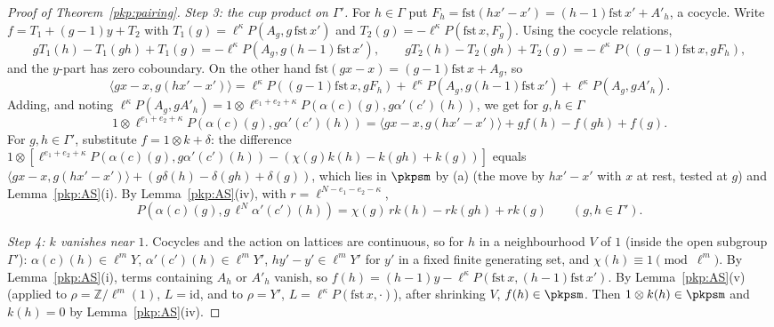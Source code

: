 \documentclass[10pt]{amsart}
\theoremstyle{definition}
\theoremstyle{remark}
\newcommand{\Z}{\mathbb Z}
\begin{document}
\begin{proof}[Proof of Theorem~\ref{pkp:pairing}]
\emph{Step 3: the cup product on $\Gamma'$.} For $h\in\Gamma$ put $F_h=\mathrm{fst}(hx'-x')=(h-1)
\mathrm{fst}\,x'+A'_h$, a cocycle. Write $f=T_1+(g-1)y+T_2$ with $T_1(g)=\ell^\kappa P(A_g,g\,
\mathrm{fst}\,x')$ and $T_2(g)=-\ell^\kappa P(\mathrm{fst}\,x,F_g)$. Using the cocycle relations,
\[
gT_1(h)-T_1(gh)+T_1(g)=-\ell^\kappa P(A_g,g(h-1)\mathrm{fst}\,x'),\qquad
gT_2(h)-T_2(gh)+T_2(g)=-\ell^\kappa P((g-1)\mathrm{fst}\,x,gF_h),
\]
and the $y$-part has zero coboundary. On the other hand $\mathrm{fst}(gx-x)=(g-1)\mathrm{fst}\,x+A_g$, so
\[
\langle gx-x,g(hx'-x')\rangle=\ell^\kappa P((g-1)\mathrm{fst}\,x,gF_h)+\ell^\kappa
P(A_g,g(h-1)\mathrm{fst}\,x')+\ell^\kappa P(A_g,gA'_h).
\]
Adding, and noting $\ell^\kappa P(A_g,gA'_h)=1\otimes\ell^{e_1+e_2+\kappa}P(\alpha(c)(g),g\alpha'(c')(h))$,
we get for $g,h\in\Gamma$
\[
1\otimes\ell^{e_1+e_2+\kappa}P(\alpha(c)(g),g\alpha'(c')(h))=\langle
gx-x,g(hx'-x')\rangle+gf(h)-f(gh)+f(g).
\]
For $g,h\in\Gamma'$, substitute $f=1\otimes k+\delta$: the difference
$1\otimes[\ell^{e_1+e_2+\kappa}P(\alpha(c)(g),g\alpha'(c')(h))-(\chi(g)k(h)-k(gh)+k(g))]$ equals
$\langle gx-x,g(hx'-x')\rangle+(g\delta(h)-\delta(gh)+\delta(g))$, which lies in $\pkpsm$ by (a)
(the move by $hx'-x'$ with $x$ at rest, tested at $g$) and Lemma~\ref{pkp:AS}(i). By
Lemma~\ref{pkp:AS}(iv), with $r=\ell^{N-e_1-e_2-\kappa}$,
\begin{equation}\label{pkp:eq-cob}
P(\alpha(c)(g),g\,\ell^N\alpha'(c')(h))=\chi(g)\,rk(h)-rk(gh)+rk(g)\qquad(g,h\in\Gamma').
\end{equation}

\emph{Step 4: $k$ vanishes near $1$.} Cocycles and the action on lattices are continuous, so for $h$
in a neighbourhood $V$ of $1$ (inside the open subgroup $\Gamma'$): $\alpha(c)(h)\in\ell^m Y$,
$\alpha'(c')(h)\in\ell^mY'$, $hy'-y'\in\ell^mY'$ for $y'$ in a fixed finite generating set, and
$\chi(h)\equiv1\pmod{\ell^m}$. By Lemma~\ref{pkp:AS}(i), terms containing $A_h$ or $A'_h$ vanish, so
$f(h)=(h-1)y-\ell^\kappa P(\mathrm{fst}\,x,(h-1)\mathrm{fst}\,x')$. By Lemma~\ref{pkp:AS}(v)
(applied to $\rho=\Z/\ell^m(1)$, $L=\mathrm{id}$, and to $\rho=Y'$, $L=\ell^\kappa
P(\mathrm{fst}\,x,\cdot)$), after shrinking $V$, $f(h)\in\pkpsm$. Then $1\otimes k(h)\in\pkpsm$ and
$k(h)=0$ by Lemma~\ref{pkp:AS}(iv).


\end{proof}
\end{document}

